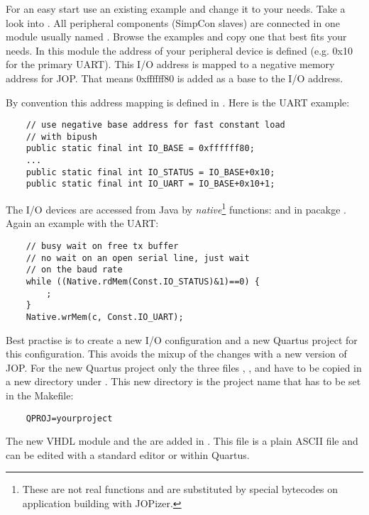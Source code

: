 For an easy start use an existing example and change it to your
needs. Take a look into . All peripheral
components (SimpCon slaves) are connected in one module usually named
. Browse the examples and copy one that best fits
your needs. In this module the address of your peripheral device is
defined (e.g. 0x10 for the primary UART). This I/O address is mapped
to a negative memory address for JOP. That means 0xffffff80 is added
as a base to the I/O address.

By convention this address mapping is defined in
. Here is the UART example:

\begin{lstlisting}
    // use negative base address for fast constant load
    // with bipush
    public static final int IO_BASE = 0xffffff80;
    ...
    public static final int IO_STATUS = IO_BASE+0x10;
    public static final int IO_UART = IO_BASE+0x10+1;
\end{lstlisting}

The I/O devices are accessed from Java by
\emph{native}\footnote{These are not real functions and are
substituted by special bytecodes on application building with
JOPizer.} functions:  and 
in pacakge . Again an example with the UART:

\begin{lstlisting}
    // busy wait on free tx buffer
    // no wait on an open serial line, just wait
    // on the baud rate
    while ((Native.rdMem(Const.IO_STATUS)&1)==0) {
        ;
    }
    Native.wrMem(c, Const.IO_UART);
\end{lstlisting}

Best practise is to create a new I/O configuration
 and a new Quartus project for this
configuration. This avoids the mixup of the changes with a new
version of JOP. For the new Quartus project only the three files
, , and  have to be copied
in a new directory under . This new directory is the
project name that has to be set in the Makefile:

\begin{lstlisting}
    QPROJ=yourproject
\end{lstlisting}

The new VHDL module and the  are added in
. This file is a plain ASCII file and can be edited
with a standard editor or within Quartus.

